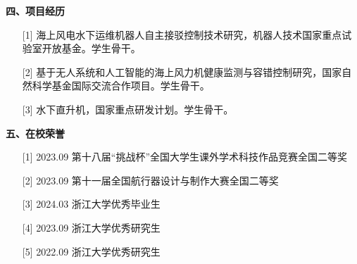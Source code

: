 \vspace{0.6cm}
{\noindent \textbf{四、项目经历}}
\begin{enumerate}[leftmargin=0.75cm, itemsep=0cm]
    \item [{[1]}]
    海上风电水下运维机器人自主接驳控制技术研究，机器人技术国家重点试验室开放基金。学生骨干。
    \item [{[2]}]
    基于无人系统和人工智能的海上风力机健康监测与容错控制研究，国家自然科学基金国际交流合作项目。学生骨干。
    \item [{[3]}]
    水下直升机，国家重点研发计划。学生骨干。    
\end{enumerate}

\vspace{0.6cm}
{\noindent \textbf{五、在校荣誉}}

\begin{enumerate}[leftmargin=0.75cm, itemsep=0cm]
    \item [{[1]}]
    2023.09 第十八届“挑战杯”全国大学生课外学术科技作品竞赛全国二等奖
    \item [{[2]}]
    2023.09 第十一届全国航行器设计与制作大赛全国二等奖
    \item [{[3]}]
    2024.03 浙江大学优秀毕业生
    \item [{[4]}]
    2023.09 浙江大学优秀研究生
    \item [{[5]}]
    2022.09 浙江大学优秀研究生
\end{enumerate}

